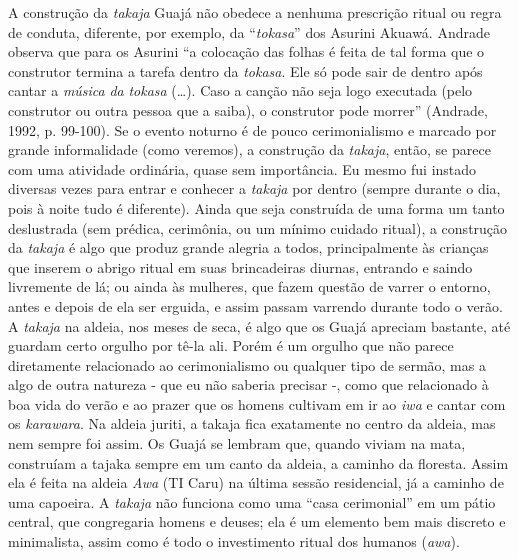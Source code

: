 A construção da \emph{takaja} Guajá não obedece a nenhuma prescrição
ritual ou regra de conduta, diferente, por exemplo, da ``\emph{tokasa}''
dos Asurini Akuawá. Andrade observa que para os Asurini ``a colocação das
folhas é feita de tal forma que o construtor termina a tarefa dentro da
\emph{tokasa}. Ele só pode sair de dentro após cantar a \emph{música}
\emph{da} \emph{tokasa} (\ldots{}). Caso a canção não seja logo executada
(pelo construtor ou outra pessoa que a saiba), o construtor pode morrer''
(Andrade, 1992, p. 99-100). Se o evento noturno é de pouco
cerimonialismo e marcado por grande informalidade (como veremos), a
construção da \emph{takaja}, então, se parece com uma atividade
ordinária, quase sem importância. Eu mesmo fui instado diversas vezes
para entrar e conhecer a \emph{takaja} por dentro (sempre durante o dia,
pois à noite tudo é diferente). Ainda que seja construída de uma forma
um tanto deslustrada (sem prédica, cerimônia, ou um mínimo cuidado
ritual), a construção da \emph{takaja} é algo que produz grande alegria
a todos, principalmente às crianças que inserem o abrigo ritual em suas
brincadeiras diurnas, entrando e saindo livremente de lá; ou ainda às
mulheres, que fazem questão de varrer o entorno, antes e depois de ela
ser erguida, e assim passam varrendo durante todo o verão. A
\emph{takaja} na aldeia, nos meses de seca, é algo que os Guajá apreciam
bastante, até guardam certo orgulho por tê-la ali. Porém é um orgulho
que não parece diretamente relacionado ao cerimonialismo ou qualquer
tipo de sermão, mas a algo de outra natureza - que eu não saberia
precisar -, como que relacionado à boa vida do verão e ao prazer que os
homens cultivam em ir ao \emph{iwa} e cantar com os \emph{karawara}. Na
aldeia juriti, a takaja fica exatamente no centro da aldeia, mas nem
sempre foi assim. Os Guajá se lembram que, quando viviam na mata,
construíam a tajaka sempre em um canto da aldeia, a caminho da floresta.
Assim ela é feita na aldeia \emph{Awa} (TI Caru) na última sessão
residencial, já a caminho de uma capoeira. A \emph{takaja} não funciona
como uma ``casa cerimonial'' em um pátio central, que congregaria homens
e deuses; ela é um elemento bem mais discreto e minimalista, assim como
é todo o investimento ritual dos humanos (\emph{awa}).


